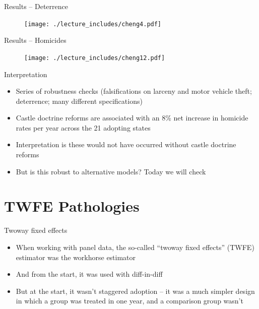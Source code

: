 \documentclass{beamer}
\begin{document}
\begin{frame}{Results -- Deterrence}
	
	\begin{figure}
	\texttt{[image: ./lecture\_includes/cheng4.pdf]}
	\end{figure}
\end{frame}




\begin{frame}{Results -- Homicides}
	
	\begin{figure}
	\texttt{[image: ./lecture\_includes/cheng12.pdf]}
	\end{figure}
\end{frame}



\begin{frame}{Interpretation}
	
	\begin{itemize}
	\item Series of robustness checks (falsifications on larceny and motor vehicle theft; deterrence; many different specifications)
	\item Castle doctrine reforms are associated with an 8\% net increase in homicide rates per year across the 21 adopting states
	\item Interpretation is these would not have occurred without castle doctrine reforms
	\item But is this robust to alternative models? Today we will check
	\end{itemize}
\end{frame}






\section{TWFE Pathologies}

\begin{frame}{Twoway fixed effects}

\begin{itemize}
\item When working with panel data, the so-called ``twoway fixed effects'' (TWFE) estimator was the workhorse estimator
\item And from the start, it was used with diff-in-diff
\item But at the start, it wasn't staggered adoption -- it was a much simpler design in which a group was treated in one year, and a comparison group wasn't
\end{itemize}

\end{frame}
\end{document}
